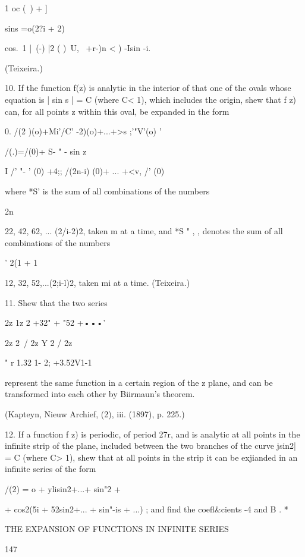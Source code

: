 {{1 oc (\ )  + ] 

sins  =o(2?i + 2) 



cos.\  1 |\ (-) |2 (  )\  U, \   +r-)n < )  -Isin -i. 



(Teixeira.) 

10. If the function f(z) is analytic in the interior of that one of the ovals whose 
equation is | sin s | = C (where C< 1), which includes the origin, shew that f z) can, for all 
points z within this oval, be expanded in the form 

0. /(2 )(o)+Mi'/C'  -2)(o)+...+>s ;'"V'(o) ' 

/(.)=/(0)+ S-   " -  sin z 

I /' "- ' (0) +4;; /(2n-i) (0)+ ... +<v, /' (0) 

where *S'  is the sum of all combinations of the numbers 

2n 

22, 42, 62, ... (2/i-2)2, 
taken m at a time, and *S " , , denotes the sum of all combinations of the numbers 

' 2(1 + 1 

12, 32, 52,...(2;i-l)2, 
taken mi at a time. (Teixeira.) 

11. Shew that the two series 

2z  1z  
2 +32" + "52 +•••' 

2z 2\  / 2z Y 2  / 2z 

 "  r  1.32 1- 2; +3.52V1-1 

represent the same function in a certain region of the z plane, and can be transformed 
into each other by Biirmaun's theorem. 

(Kapteyn, Nieuw Archief, (2), iii. (1897), p. 225.) 

12. If a function f z) is periodic, of period 27r, and is analytic at all points in the 
infinite strip of the plane, included between the two branches of the curve jsin2| = C 
(where C> 1), shew that at all points in the strip it can be exjianded in an infinite series 
of the form 

/(2) =  o + ylisin2+...+  sin"2 + 

+ cos2(5i + 52sin2+... +   sin"-is + ...) ; 
and find the coefl\&cients -4  and B . * 



THE EXPANSION OF FUNCTIONS IN INFINITE SERIES 



147 



}}
